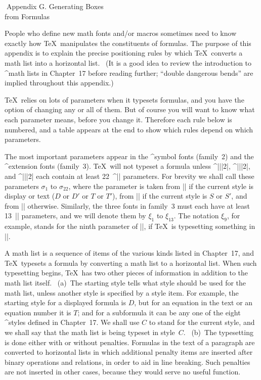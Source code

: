 \beginchapter Appendix G. Generating Boxes\\from Formulas

\ninepoint
People who define new math fonts and/or macros sometimes need to know
exactly how \TeX\ manipulates the constituents of formulas. The purpose
of this appendix is to explain the precise positioning rules by which
\TeX\ converts a math list into a horizontal list. \ (It is a good idea
to review the introduction to ^{math lists} in Chapter~17 before
reading further; ``double dangerous bends'' are implied throughout
this appendix.)

\TeX\ relies on lots of parameters when it typesets formulas, and you have
the option of changing any or all of them. But of course you will want to
know what each parameter means, before you change it. Therefore each rule
below is numbered, and a table appears at the end to show which rules
depend on which parameters.

The most important parameters appear in the ^{symbol fonts} (family~2) and
the ^{extension fonts} (family~3). \TeX\ will not typeset a formula unless
^|\textfont||2|, ^|\scriptfont||2|, and ^|\scriptscriptfont||2| each contain
at least 22~^|\fontdimen| parameters. For brevity we shall call these parameters
$\sigma_1$ to $\sigma_{22}$, where the parameter is taken from
|| if the current style is display or text ($D$ or $D'$ or $T$
or $T'$), from || if the current style is $S$ or $S'$, and from
|| otherwise. Similarly, the three fonts in family~3
must each have at least 13~|\fontdimen| parameters, and we will denote
them by $\xi_1$ to $\xi_{13}$. The notation $\xi_9$, for example, stands for
the ninth parameter of\/ ||, if \TeX\ is typesetting something
in |\scriptstyle|.

A math list is a sequence of items of the various kinds listed in Chapter~17,
and \TeX\ typesets a formula by converting a math list to a horizontal
list. When such typesetting begins, \TeX\ has two other pieces of
information in addition to the math list itself. \ (a)~The starting style
tells what style should be used for the math list, unless another style
is specified by a style item. For example, the starting style for a
displayed formula is $D$, but for an equation in the text or an equation
number it is $T$; and for a subformula it can be any one of the eight
^{styles} defined in Chapter~17. We shall use $C$ to stand for the current
style, and we shall say that the math list is being typeset in style~$C$.
\ (b)~The typesetting is done either with or without penalties. Formulas
in the text of a paragraph are converted to horizontal lists in which
additional penalty items are inserted after binary operations and relations,
in order to aid in line breaking. Such penalties are not inserted in
other cases, because they would serve no useful function.


